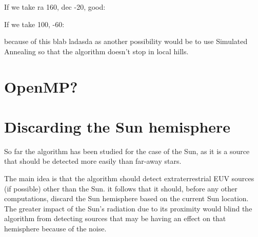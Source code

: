 If we take ra 160, dec -20, good:


If we take 100, -60:


because of this blab ladasda as another possibility would be to use Simulated Annealing so that the algorithm doesn't stop in local hills.


\clearpage
\section{OpenMP?}


\section{Discarding the Sun hemisphere}

So far the algorithm has been studied for the case of the Sun, as it is a source that should be detected more easily than far-away stars. 

The main idea is that the algorithm should detect extraterrestrial EUV sources (if possible) other than the Sun. it follows that it should, before any other computations, discard the Sun hemisphere based on the current Sun location. The greater impact of the Sun's radiation due to its proximity would blind the algorithm from detecting sources that may be having an effect on that hemisphere because of the noise.